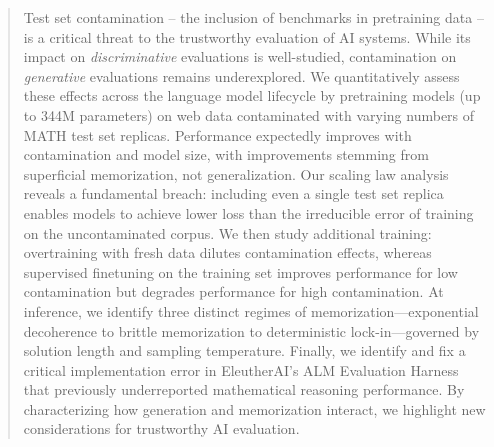 \documentclass{article}
\theoremstyle{plain}
\theoremstyle{definition}
\theoremstyle{remark}
\begin{document}


\printAffiliationsAndNotice{}  %

\begin{abstract}
    Test set contamination -- the inclusion of benchmarks in pretraining data -- is a critical threat to the trustworthy evaluation of AI systems.
    While its impact on \emph{discriminative} evaluations is well-studied, contamination on \emph{generative} evaluations remains underexplored.
    We quantitatively assess these effects across the language model lifecycle by pretraining models (up to 344M parameters) on web data contaminated with varying numbers of MATH test set replicas.
    Performance expectedly improves with contamination and model size, with improvements stemming from superficial memorization, not generalization.
    Our scaling law analysis reveals a fundamental breach: including even a single test set replica enables models to achieve lower loss than the irreducible error of training on the uncontaminated corpus.
    We then study additional training: overtraining with fresh data dilutes contamination effects, whereas supervised finetuning on the training set improves performance for low contamination but degrades performance for high contamination.
    At inference, we identify three distinct regimes of memorization—exponential decoherence to brittle memorization to deterministic lock-in—governed by solution length and sampling temperature.
    Finally, we identify and fix a critical implementation error in EleutherAI's ALM Evaluation Harness that previously underreported mathematical reasoning performance. 
    By characterizing how generation and memorization interact, we highlight new considerations for trustworthy AI evaluation.
\end{abstract}









\clearpage


\clearpage





\clearpage
\appendix
\onecolumn

\end{document}
